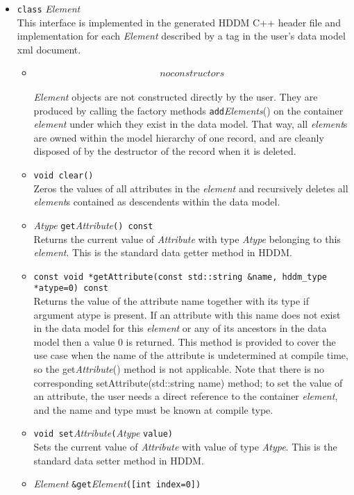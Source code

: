 \documentclass{revtex4}
\begin{document}
\begin{itemize}
\begin{itemize}
\end{itemize}
\item \texttt{class} {\em Element}\\
This interface is implemented in the generated HDDM C++ header file and
implementation for each {\em Element} described by a tag in the user's
data model xml document.
\begin{itemize}
\item \[no constructors\]\\
{\em Element} objects are not constructed directly by the user. They are
produced by calling the factory methods \texttt{add}{\em Elements}() on
the container {\em element} under which they exist in the data model.
That way, all {\em element}s are owned within the model hierarchy of one
record, and are cleanly disposed of by the destructor of the record when it
is deleted.
\item \texttt{void clear()}\\
Zeros the values of all attributes in the {\em element} and recursively
deletes all {\em element}s contained as descendents within the data model.
\item {\em Atype} \texttt{get}{\em Attribute}\texttt{() const}\\
Returns the current value of {\em Attribute} with type {\em Atype}
belonging to this {\em element}. This is the standard data getter method
in HDDM.
\item \texttt{const void *getAttribute(const std::string \&name, hddm\_type *atype=0) const}\\
Returns the value of the attribute name together with its type if argument
atype is present. If an attribute with this name does not exist in the data
model for this {\em element} or any of its ancestors in the data model then a 
value 0 is returned. This method is provided to cover the use case when the
name of the attribute is undetermined at compile time, so the 
get{\em Attribute}() method is not applicable. Note that there is no corresponding
setAttribute(std::string name) method; to set the value of an attribute, the
user needs a direct reference to the container {\em element}, and the name
and type must be known at compile type.
\item \texttt{void set}{\em Attribute}\texttt{(}{\em Atype} \texttt{value)}\\
Sets the current value of {\em Attribute} with value of type {\em Atype}.
This is the standard data setter method in HDDM.
\item {\em Element} \texttt{\&get}{\em Element}\texttt{([int index=0])}\\

\end{itemize}
\end{itemize}
\end{document}
